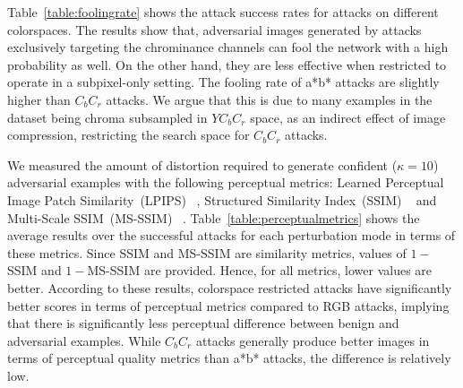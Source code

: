 Table~\ref*{table:foolingrate} shows the attack success rates for attacks on different colorspaces. The results show that, adversarial images generated by attacks exclusively targeting the chrominance channels can fool the network with a high probability as well. On the other hand, they are less effective when restricted to operate in a subpixel-only setting. The fooling rate of a*b* attacks are slightly higher than \(C_bC_r\) attacks. We argue that this is due to many examples in the dataset being chroma subsampled in \(YC_bC_r\) space, as an indirect effect of image compression, restricting the search space for \(C_bC_r\) attacks.

We measured the amount of distortion required to generate confident (\(\kappa = 10\)) adversarial examples with the following perceptual metrics: Learned Perceptual Image Patch Similarity~(LPIPS) ~\cite{zhang2018unreasonable}, Structured Similarity Index~(SSIM) ~\cite{wang2004image} and Multi-Scale SSIM~(MS-SSIM) ~\cite{wang2003multiscale}. Table~\ref{table:perceptualmetrics} shows the average results over the successful attacks for each perturbation mode in terms of these metrics. Since SSIM and MS-SSIM are similarity metrics, values of \(1-\)SSIM and \(1-\)MS-SSIM are provided. Hence, for all metrics, lower values are better. According to these results, colorspace restricted attacks have significantly better scores in terms of perceptual metrics compared to RGB attacks, implying that there is significantly less perceptual difference between benign and adversarial examples. While \(C_bC_r\) attacks generally produce better images in terms of perceptual quality metrics than a*b* attacks, the difference is relatively low.
